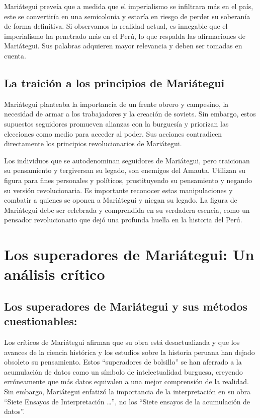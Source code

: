 \documentclass[
  jou,
  floatsintext,
  longtable,
  a4paper,
  nolmodern,
  notxfonts,
  notimes,
  12pt,
  colorlinks=true,linkcolor=blue,citecolor=blue,urlcolor=blue]{apa7}
\begin{document}
Mariátegui preveía que a medida que el imperialismo se infiltrara más en
el país, este se convertiría en una semicolonia y estaría en riesgo de
perder su soberanía de forma definitiva. Si observamos la realidad
actual, es innegable que el imperialismo ha penetrado más en el Perú, lo
que respalda las afirmaciones de Mariátegui. Sus palabras adquieren
mayor relevancia y deben ser tomadas en cuenta.

\subsection{La traición a los principios de
Mariátegui}\label{la-traiciuxf3n-a-los-principios-de-mariuxe1tegui}

Mariátegui planteaba la importancia de un frente obrero y campesino, la
necesidad de armar a los trabajadores y la creación de soviets. Sin
embargo, estos supuestos seguidores promueven alianzas con la burguesía
y priorizan las elecciones como medio para acceder al poder. Sus
acciones contradicen directamente los principios revolucionarios de
Mariátegui.

Los individuos que se autodenominan seguidores de Mariátegui, pero
traicionan su pensamiento y tergiversan su legado, son enemigos del
Amauta. Utilizan su figura para fines personales y políticos,
prostituyendo su pensamiento y negando su versión revolucionaria. Es
importante reconocer estas manipulaciones y combatir a quienes se oponen
a Mariátegui y niegan su legado. La figura de Mariátegui debe ser
celebrada y comprendida en su verdadera esencia, como un pensador
revolucionario que dejó una profunda huella en la historia del Perú.

\section{Los superadores de Mariátegui: Un análisis
crítico}\label{los-superadores-de-mariuxe1tegui-un-anuxe1lisis-cruxedtico}

\subsection{Los superadores de Mariátegui y sus métodos
cuestionables:}\label{los-superadores-de-mariuxe1tegui-y-sus-muxe9todos-cuestionables}

Los críticos de Mariátegui afirman que su obra está desactualizada y que
los avances de la ciencia histórica y los estudios sobre la historia
peruana han dejado obsoleto su pensamiento. Estos ``superadores de
bolsillo'' se han aferrado a la acumulación de datos como un símbolo de
intelectualidad burguesa, creyendo erróneamente que más datos equivalen
a una mejor comprensión de la realidad. Sin embargo, Mariátegui enfatizó
la importancia de la interpretación en su obra ``Siete Ensayos de
Interpretación \ldots{}'', no los ``Siete ensayos de la acumulación de
datos''.
\end{document}

